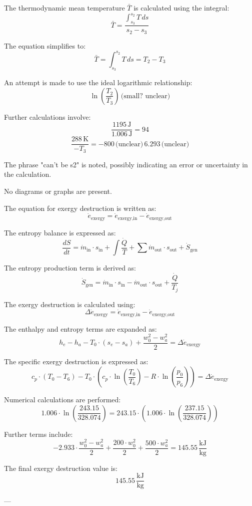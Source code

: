The thermodynamic mean temperature \( \bar{T} \) is calculated using the integral:  
\[
\bar{T} = \frac{\int_{s_3}^{s_2} T \, ds}{s_2 - s_3}
\]  

The equation simplifies to:  
\[
\bar{T} = \int_{s_3}^{s_2} T \, ds = T_2 - T_3
\]  

An attempt is made to use the ideal logarithmic relationship:  
\[
\ln\left(\frac{T_2}{T_3}\right) \, \text{(small? unclear)}
\]  

Further calculations involve:  
\[
\frac{1195 \, \text{J}}{1.006 \, \text{J}} = 94
\]  
\[
\frac{288 \, \text{K}}{-T_3} = -800 \, \text{(unclear)} \, 6.293 \, \text{(unclear)}
\]  

The phrase "can't be s2" is noted, possibly indicating an error or uncertainty in the calculation.  

No diagrams or graphs are present.

The equation for exergy destruction is written as:  
\[
\dot{e}_{\text{exergy}} = \dot{e}_{\text{exergy,in}} - \dot{e}_{\text{exergy,out}}
\]  

The entropy balance is expressed as:  
\[
\frac{dS}{dt} = \dot{m}_{\text{in}} \cdot s_{\text{in}} + \int \frac{\dot{Q}}{T} + \sum \dot{m}_{\text{out}} \cdot s_{\text{out}} + \dot{S}_{\text{gen}}
\]  

The entropy production term is derived as:  
\[
\dot{S}_{\text{gen}} = \dot{m}_{\text{in}} \cdot s_{\text{in}} - \dot{m}_{\text{out}} \cdot s_{\text{out}} + \frac{\dot{Q}}{T_j}
\]  

The exergy destruction is calculated using:  
\[
\Delta \dot{e}_{\text{exergy}} = \dot{e}_{\text{exergy,in}} - \dot{e}_{\text{exergy,out}}
\]  

The enthalpy and entropy terms are expanded as:  
\[
h_e - h_a - T_0 \cdot (s_e - s_a) + \frac{w_0^2 - w_a^2}{2} = \Delta \dot{e}_{\text{exergy}}
\]  

The specific exergy destruction is expressed as:  
\[
c_p \cdot (T_0 - T_6) - T_0 \cdot \left( c_p \cdot \ln \left( \frac{T_0}{T_6} \right) - R \cdot \ln \left( \frac{p_0}{p_6} \right) \right) = \Delta \dot{e}_{\text{exergy}}
\]  

Numerical calculations are performed:  
\[
1.006 \cdot \ln \left( \frac{243.15}{328.074} \right) = 243.15 \cdot \left( 1.006 \cdot \ln \left( \frac{237.15}{328.074} \right) \right)
\]  

Further terms include:  
\[
-2.933 \cdot \frac{w_0^2 - w_a^2}{2} + \frac{200 \cdot w_0^2}{2} + \frac{500 \cdot w_a^2}{2} = 145.55 \, \frac{\text{kJ}}{\text{kg}}
\]  

The final exergy destruction value is:  
\[
145.55 \, \frac{\text{kJ}}{\text{kg}}
\]  

---
